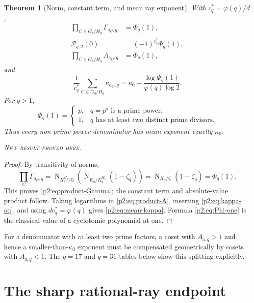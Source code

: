 \documentclass[11pt,oneside]{article}
\newtheorem{theorem}{Theorem}[section]
\theoremstyle{definition}
\theoremstyle{remark}
\newcommand{\Q}{\mathbb Q}
\newcommand{\Norm}{\operatorname{N}}
\newcommand{\newresult}{\textcolor{newgreen}{\textsc{New result proved here.}}}
\begin{document}
\begin{theorem}[Norm, constant term, and mean ray exponent]\label{p2:thm:mean-exponent}
With $c_q^*=\varphi(q)/d$,
\begin{align}
 \prod_{C\in G_q/H_q}\Gamma_{a_C,q}&=\Phi_q(1),
 \label{p2:eq:product-Gamma}\\
 \mathscr P_{q,2}(0)&=(-1)^{c_q^*}\Phi_q(1),
 \label{p2:eq:P-constant}\\
 \prod_{C\in G_q/H_q}A_{a_C,q}&=\Phi_q(1),
 \label{p2:eq:product-A}
\end{align}
and
\begin{equation}
 \boxed{
 \frac1{c_q^*}\sum_{C\in G_q/H_q}\kappa_{a_C,q}
 =\kappa_0-\frac{\log\Phi_q(1)}{\varphi(q)\log2}.}
 \label{p2:eq:mean-kappa}
\end{equation}
For $q>1$,
\begin{equation}
 \Phi_q(1)=
 \begin{cases}
 p,&q=p^s\text{ is a prime power},\\
 1,&q\text{ has at least two distinct prime divisors}.
 \end{cases}
 \label{p2:eq:Phi-one}
\end{equation}
Thus every non-prime-power denominator has mean exponent exactly $\kappa_0$.

\smallskip\noindent\newresult
\end{theorem}

\begin{proof}
By transitivity of norms,
\[
 \prod_C\Gamma_{a_C,q}
 =\Norm_{K_q^{H_q}/\Q}
 \!\left(\Norm_{K_q/K_q^{H_q}}(1-\zeta_q)\right)
 =\Norm_{K_q/\Q}(1-\zeta_q)=\Phi_q(1).
\]
This proves \eqref{p2:eq:product-Gamma}; the constant term and absolute-value product
follow. Taking logarithms in \eqref{p2:eq:product-A}, inserting \eqref{p2:eq:kappa-aq},
and using $dc_q^*=\varphi(q)$ gives \eqref{p2:eq:mean-kappa}. Formula
\eqref{p2:eq:Phi-one} is the classical value of a cyclotomic polynomial at one.
\end{proof}

\begin{remark}
For a denominator with at least two prime factors, a coset with $A_{a,q}>1$ and
hence a smaller-than-$\kappa_0$ exponent must be compensated geometrically by
cosets with $A_{a,q}<1$. The $q=17$ and $q=31$ tables below show this splitting
explicitly.
\end{remark}

\section{The sharp rational-ray endpoint}\label{p2:sec:sharp-endpoint}
\end{document}

